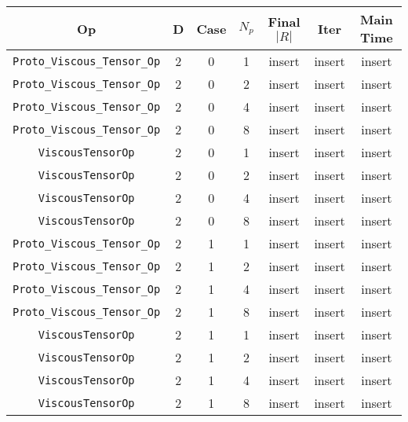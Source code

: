 \documentclass{article}
\begin{document}
\begin{small}
\begin{table}
\begin{center}
\begin{tabular}{|c|c|c|c|c|c||c|} \hline
 Op & D & Case & $N_p$ & Final $|R|$  &  Iter & Main Time \\
\hline
 {\tt Proto\_Viscous\_Tensor\_Op} & 2 & 0 &   1    &  insert  &  insert    & insert   \\
 {\tt Proto\_Viscous\_Tensor\_Op} & 2 & 0 &   2    &  insert  &  insert    & insert   \\
 {\tt Proto\_Viscous\_Tensor\_Op} & 2 & 0 &   4    &  insert  &  insert    & insert   \\
 {\tt Proto\_Viscous\_Tensor\_Op} & 2 & 0 &   8    &  insert  &  insert    & insert   \\
\hline                                                                                
 {\tt ViscousTensorOp}            & 2 & 0   & 1    &  insert  &  insert    & insert    \\
 {\tt ViscousTensorOp}            & 2 & 0   & 2    &  insert  &  insert    & insert    \\
 {\tt ViscousTensorOp}            & 2 & 0   & 4    &  insert  &  insert    & insert    \\
 {\tt ViscousTensorOp}            & 2 & 0   & 8    &  insert  &  insert    & insert    \\
\hline                                                                                      
 {\tt Proto\_Viscous\_Tensor\_Op} & 2 & 1   & 1    &  insert  &  insert    & insert   \\
 {\tt Proto\_Viscous\_Tensor\_Op} & 2 & 1   & 2    &  insert  &  insert    & insert   \\
 {\tt Proto\_Viscous\_Tensor\_Op} & 2 & 1   & 4    &  insert  &  insert    & insert   \\
 {\tt Proto\_Viscous\_Tensor\_Op} & 2 & 1   & 8    &  insert  &  insert    & insert   \\
\hline                                                                                
 {\tt ViscousTensorOp}            & 2 & 1   & 1    &  insert  &  insert    & insert    \\
 {\tt ViscousTensorOp}            & 2 & 1   & 2    &  insert  &  insert    & insert    \\
 {\tt ViscousTensorOp}            & 2 & 1   & 4    &  insert  &  insert    & insert    \\
 {\tt ViscousTensorOp}            & 2 & 1   & 8    &  insert  &  insert    & insert    \\

\end{tabular}
\end{center}
\end{table}
\end{small}
\end{document}
